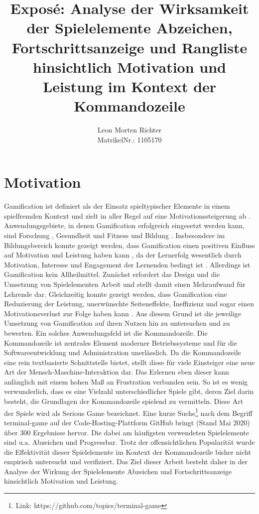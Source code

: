 \documentclass[
    a4paper,
    doc,
    12pt,
    natbib,
]{apa6}
\title{Exposé: Analyse der Wirksamkeit  der Spielelemente Abzeichen, Fortschrittsanzeige und Rangliste hinsichtlich Motivation und Leistung im Kontext der Kommandozeile}
\author{Leon Morten Richter\\MatrikelNr.: 1105170}
\affiliation{Christian-Albrechts-Universität zu Kiel}
\begin{document}
\maketitle

\section{Motivation}
Gamification ist definiert als der Einsatz spieltypischer Elemente in einem spielfremden Kontext \citep{deterding_game_2011} und zielt in aller Regel auf eine Motivationssteigerung ab \citep{takahashi_gamification_2010}. Anwendungsgebiete, in denen Gamification erfolgreich eingesetzt werden kann, sind Forschung \citep{brauer_erhohung_2019}, Gesundheit und Fitness \citep{johnson_gamification_2016} und Bildung \citep{de_freitas_prepared_2006}. Insbesondere im Bildungsbereich konnte gezeigt werden, dass Gamification einen positiven Einfluss auf Motivation und Leistung haben kann \citep{ibanez_gamification_2014}, da der Lernerfolg wesentlich durch Motivation, Interesse und Engagement der Lernenden bedingt ist \citep{astin_student_1984}. Allerdings ist Gamification kein Allheilmittel. Zunächst erfordert das Design und die Umsetzung von Spielelementen Arbeit und stellt damit einen Mehraufwand für Lehrende dar. Gleichzeitig konnte gezeigt werden, dass Gamification eine Reduzierung der Leistung, unerwünschte Seiteneffekte, Ineffizienz und sogar einen Motivationsverlust zur Folge haben kann \citep{toda_dark_2018}. Aus diesem Grund ist die jeweilige Umsetzung von Gamification auf ihren Nutzen hin zu untersuchen und zu bewerten. Ein solches Anwendungsfeld ist die Kommandozeile. Die Kommandozeile ist zentrales Element moderner Betriebssysteme und für die Softwareentwicklung und Administration unerlässlich. Da die Kommandozeile eine rein textbasierte Schnittstelle bietet, stellt diese für viele Einsteiger eine neue Art der Mensch-Maschine-Interaktion dar. Das Erlernen eben dieser kann anfänglich mit einem hohen Maß an Frustration verbunden sein. So ist es wenig verwunderlich, dass es eine Vielzahl unterschiedlicher Spiele gibt, deren Ziel darin besteht, die Grundlagen der Kommandozeile spielend zu vermitteln. Diese Art der Spiele wird als Serious Game bezeichnet. Eine kurze Suche\footnote{Link: https://github.com/topics/terminal-game} nach dem Begriff \glqq terminal-game\grqq{} auf der Code-Hosting-Plattform GitHub bringt (Stand Mai 2020) über 300 Ergebnisse hervor. Die dabei am häufigsten verwendeten Spielelemente sind u.a. Abzeichen und Progressbar.
Trotz der offensichtlichen Popularität wurde die Effektivität dieser Spielelemente im Kontext der Kommandozeile bisher nicht empirisch untersucht und verifiziert. Das Ziel dieser Arbeit besteht daher in der Analyse der Wirkung der Spielelemente Abzeichen und Fortschrittsanzeige hinsichtlich Motivation und Leistung.
\end{document}
